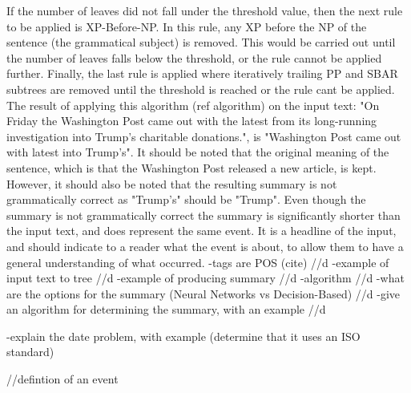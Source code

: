 \par If the number of leaves did not fall under the threshold value, then the next rule to be applied is XP-Before-NP. In this rule, any XP before the NP of the sentence (the grammatical subject) is removed. This would be carried out until the number of leaves falls below the threshold, or the rule cannot be applied further. Finally, the last rule is applied where iteratively trailing PP and SBAR subtrees are removed until the threshold is reached or the rule cant be applied. The result of applying this algorithm (ref algorithm) on the input text: "On Friday the Washington Post came out with the latest from its long-running investigation into Trump's charitable donations.", is "Washington Post came out with latest into Trump's". It should be noted that the original meaning of the sentence, which is that the Washington Post released a new article, is kept. However, it should also be noted that the resulting summary is not grammatically correct as "Trump's" should be "Trump". Even though the summary is not grammatically correct the summary is significantly shorter than the input text, and does represent the same event. It is a headline of the input, and should indicate to a reader what the event is about, to allow them to have a general understanding of what occurred.
-tags are POS (cite) //d
-example of input text to tree //d
-example of producing summary //d 
-algorithm //d 
-what are the options for the summary (Neural Networks vs Decision-Based) //d
-give an algorithm for determining the summary, with an example //d

-explain the date problem, with example (determine that it uses an ISO standard)



//defintion of an event


